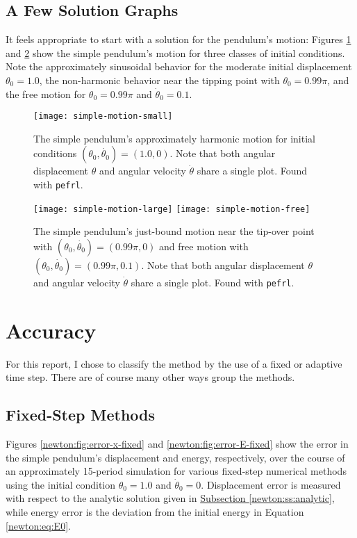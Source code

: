 \documentclass[11pt, a4paper]{article}
\begin{document}
\subsection{A Few Solution Graphs}
It feels appropriate to start with a solution for the pendulum's motion: Figures \ref{newton:fig:simple-motion1} and \ref{newton:fig:simple-motion2} show the simple pendulum's motion for three classes of initial conditions. Note the approximately sinusoidal behavior for the moderate initial displacement $ \theta_{0} = 1.0 $, the non-harmonic behavior near the tipping point with $ \theta_{0} = 0.99 \pi $, and the free motion for $ \theta_{0} = 0.99 \pi $ and $ \dot{\theta}_{0} = 0.1 $. 

\begin{figure}[htb!]
\centering
\texttt{[image: simple-motion-small]}\vfill

\caption{The simple pendulum's approximately harmonic motion for  initial conditions $ (\theta_{0}, \dot{\theta_{0}}) = (1.0, 0) $. Note that both angular displacement $ \theta $ and angular velocity $ \dot{\theta} $ share a single plot. Found with \texttt{pefrl}.}
\vspace{-3mm}
\label{newton:fig:simple-motion1}
\end{figure}


\begin{figure}[htb!]
\centering
\texttt{[image: simple-motion-large]}\vfill
\texttt{[image: simple-motion-free]} \vfill
\vspace{-3mm}
\caption{The simple pendulum's just-bound motion near the tip-over point with $ (\theta_{0}, \dot{\theta_{0}}) = (0.99 \pi, 0) $ and free motion with $ (\theta_{0}, \dot{\theta_{0}}) = (0.99 \pi, 0.1) $.  Note that both angular displacement $ \theta $ and angular velocity $ \dot{\theta} $ share a single plot. Found with \texttt{pefrl}.}

\label{newton:fig:simple-motion2}
\end{figure}


\section{Accuracy}
For this report, I chose to classify the method by the use of a fixed or adaptive time step. There are of course many other ways group the methods.

\subsection{Fixed-Step Methods}
Figures \ref{newton:fig:error-x-fixed} and \ref{newton:fig:error-E-fixed} show the error in the simple pendulum's displacement and energy, respectively, over the course of an approximately 15-period simulation for various fixed-step numerical methods using the initial condition  $ \theta_{0} = 1.0 $ and $ \dot{\theta}_{0} = 0 $. Displacement error is measured with respect to the analytic solution given in \hyperref[newton:ss:analytic]{Subsection \ref{newton:ss:analytic}}, while energy error is the deviation from the initial energy in Equation \ref{newton:eq:E0}. 
\end{document}
